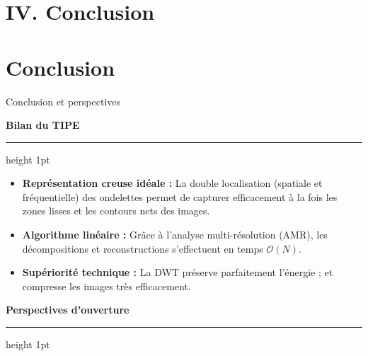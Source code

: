 \documentclass[10pt]{beamer}
\begin{document}
	\section{IV. Conclusion}
	
	\section*{Conclusion}
	
	\begin{frame}{Conclusion et perspectives}
		\vspace{-0.1em}
		
		{\large\bfseries\color{bleu} Bilan du TIPE}
		\nopagebreak
		\vspace{0.2em}
		{\color{bleumed}\hrule height 1pt}
		\vspace{0.6em}
		
		\begin{itemize}
			\item[\color{bleu}\blacktriangleright] \textbf{Représentation creuse idéale :} La double localisation (spatiale et fréquentielle) des ondelettes permet de capturer efficacement à la fois les zones lisses et les contours nets des images.
			\item[\color{bleu}\blacktriangleright] \textbf{Algorithme linéaire :} Grâce à l'analyse multi-résolution (AMR), les décompositions et reconstructions s'effectuent en temps $\mathcal{O}(N)$.
			\item[\color{bleu}\blacktriangleright] \textbf{Supériorité technique :} La DWT préserve parfaitement l'énergie ; et compresse les images très efficacement.
		\end{itemize}
		
		\vspace{1.0em}
		
		{\large\bfseries\color{bleu} Perspectives d'ouverture}
		\nopagebreak
		\vspace{0.2em}
		{\color{bleumed}\hrule height 1pt}
		\vspace{0.6em}
		

\end{frame}
\end{document}
